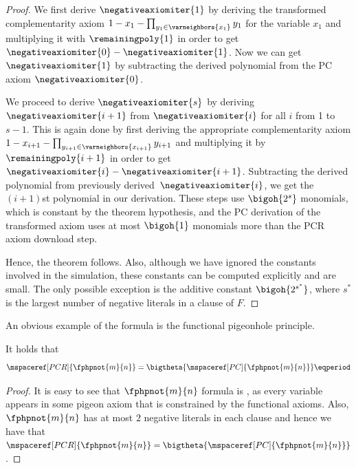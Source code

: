 \begin{proof}
  We first derive $\negativeaxiomiter{1}$ by deriving the transformed
  complementarity axiom $1 - x_1 - \prod_{y_1 \in \varneighbors{x_1}}
  y_1$ for the variable $x_1$ and multiplying it with
  $\remainingpoly{1}$ in order to get
  $\negativeaxiomiter{0} - \negativeaxiomiter{1}$. Now we can get
  $\negativeaxiomiter{1}$ by subtracting the derived polynomial from
  the PC axiom $\negativeaxiomiter{0}$.


  We proceed to derive $\negativeaxiomiter{s}$ by deriving
  $\negativeaxiomiter{i + 1}$ from $\negativeaxiomiter{i}$ for all $i$
  from 1 to $s - 1$. This is again done by first deriving the
  appropriate complementarity axiom $1 - x_{i + 1} - \prod_{y_{i + 1}
    \in \varneighbors{x_{i + 1}}} y_{i + 1}$ and multiplying it by
  $\remainingpoly{i + 1}$ in order to get
  $\negativeaxiomiter{i} - \negativeaxiomiter{i + 1}$. Subtracting the
  derived polynomial from previously derived~$\negativeaxiomiter{i}$,
  we get the $(i + 1)$st polynomial in our derivation. These steps use
  $\bigoh{2^{s}}$ monomials, which is constant by the theorem hypothesis,
  and the PC derivation of the transformed axiom uses at most
  $\bigoh{1}$ monomials more than the PCR axiom download step.

  Hence, the theorem follows. Also, although we have ignored the
  constants involved in the simulation, these constants can be
  computed explicitly and are small. The only possible exception is
  the additive constant $\bigoh{2^{s^{*}}}$, where $s^{*}$ is the
  largest number of negative literals in a clause of $F$.
\end{proof}

An obvious example of the \varweightconstrained{} formula is the
functional pigeonhole principle.

\begin{corollary}\label{cor:fphppcequalpcrspace}
  It holds that
  \begin{equation*}
    \mspaceref[PCR]{\fphpnot{m}{n}} = \bigtheta{\mspaceref[PC]{\fphpnot{m}{n}}} \eqperiod
  \end{equation*}
\end{corollary}
\begin{proof}
  It is easy to see that $\fphpnot{m}{n}$ formula is
  \varweightconstrained{}, as every variable appears in some pigeon
  axiom that is constrained by the functional axioms. Also,
  $\fphpnot{m}{n}$ has at most $2$ negative literals in each clause
  and hence we have that $\mspaceref[PCR]{\fphpnot{m}{n}} =
  \bigtheta{\mspaceref[PC]{\fphpnot{m}{n}}}$.
\end{proof}

